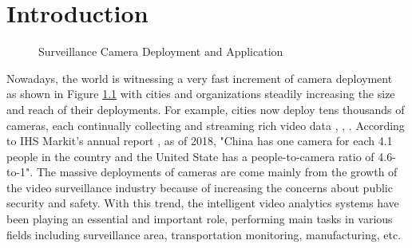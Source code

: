 \chapter{Introduction}  %
\begin{figure}
\centering
{}
\caption{Surveillance Camera Deployment and Application}
\label{fig:cctv}
\end{figure}
Nowadays, the world is witnessing a very fast increment of camera deployment ~\citep{ananthanarayanan2019demo} as shown in Figure \ref{fig:cctv} with cities and organizations steadily increasing the size and reach of their deployments. For example, cities now deploy tens thousands of cameras, each continually collecting and streaming rich video data \cite{ref0}, \cite{ref1}, \cite{ref2}. According to IHS Markit’s annual report \cite{oliverreport}, as of 2018, "China has one camera for each 4.1 people in the country and the United State has a people-to-camera ratio of 4.6-to-1". The massive deployments of cameras are come mainly from the growth of the video surveillance industry because of increasing the concerns about public security and safety. With this trend, the intelligent video analytics systems have been playing an essential and important role, performing main tasks in various fields including surveillance area, transportation monitoring, manufacturing, etc.
